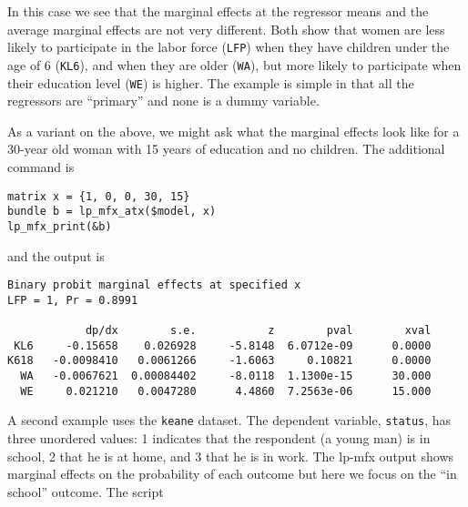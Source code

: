 \documentclass{article}
\begin{document}
In this case we see that the marginal effects at the regressor means
and the average marginal effects are not very different. Both show
that women are less likely to participate in the labor force
(\texttt{LFP}) when they have children under the age of 6
(\texttt{KL6}), and when they are older (\texttt{WA}), but more likely
to participate when their education level (\texttt{WE}) is higher. The
example is simple in that all the regressors are ``primary'' and none
is a dummy variable.

As a variant on the above, we might ask what the marginal effects look
like for a 30-year old woman with 15 years of education and no
children. The additional command is

{\small
\begin{verbatim}
matrix x = {1, 0, 0, 30, 15}
bundle b = lp_mfx_atx($model, x)
lp_mfx_print(&b)
\end{verbatim}
}
and the output is
{\small
\begin{verbatim}
Binary probit marginal effects at specified x
LFP = 1, Pr = 0.8991

            dp/dx        s.e.           z        pval        xval
 KL6     -0.15658    0.026928     -5.8148  6.0712e-09      0.0000
K618   -0.0098410   0.0061266     -1.6063     0.10821      0.0000
  WA   -0.0067621  0.00084402     -8.0118  1.1300e-15      30.000
  WE     0.021210   0.0047280      4.4860  7.2563e-06      15.000
\end{verbatim}
}

\vspace{1ex}

A second example uses the \texttt{keane} dataset. The dependent
variable, \texttt{status}, has three unordered values: 1 indicates
that the respondent (a young man) is in school, 2 that he is at home,
and 3 that he is in work. The \textsf{lp-mfx} output shows marginal
effects on the probability of each outcome but here we focus on the
``in school'' outcome. The script
\end{document}
